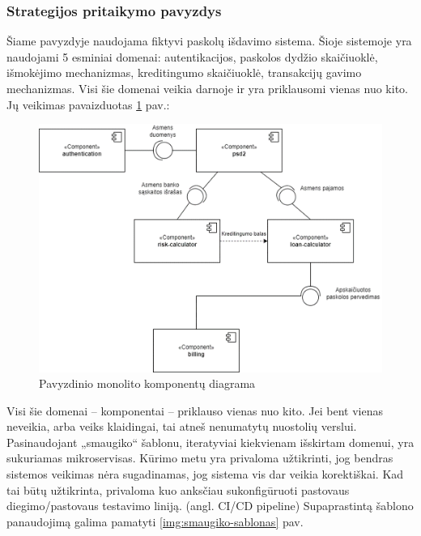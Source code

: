 \documentclass{VUMIFPSbakalaurinis}
\begin{document}
\subsubsection{Strategijos pritaikymo pavyzdys}
Šiame pavyzdyje naudojama fiktyvi paskolų išdavimo sistema. Šioje sistemoje yra naudojami 5 esminiai domenai: autentikacijos, paskolos dydžio skaičiuoklė, išmokėjimo mechanizmas, kreditingumo skaičiuoklė, transakcijų gavimo mechanizmas. Visi šie domenai veikia darnoje ir yra priklausomi vienas nuo kito. Jų veikimas pavaizduotas \ref{img:komponentu-diagrama} pav.:
\begin{figure}[H]
    \centering
    \includegraphics[scale=0.9]{img/komponentu-diagrama.png}
    \caption{Pavyzdinio monolito komponentų diagrama}
    \label{img:komponentu-diagrama}
\end{figure}

Visi šie domenai – komponentai – priklauso vienas nuo kito. Jei bent vienas neveikia, arba veiks klaidingai, tai atneš nenumatytų nuostolių verslui. Pasinaudojant „smaugiko“ šablonu, iteratyviai kiekvienam išskirtam domenui, yra sukuriamas mikroservisas. Kūrimo metu yra privaloma užtikrinti, jog bendras sistemos veikimas nėra sugadinamas, jog sistema vis dar veikia korektiškai. Kad tai būtų užtikrinta, privaloma kuo anksčiau sukonfigūruoti pastovaus diegimo/pastovaus testavimo liniją. (angl. CI/CD pipeline)  Supaprastintą šablono panaudojimą galima pamatyti \ref{img:smaugiko-sablonas} pav.
\end{document}
